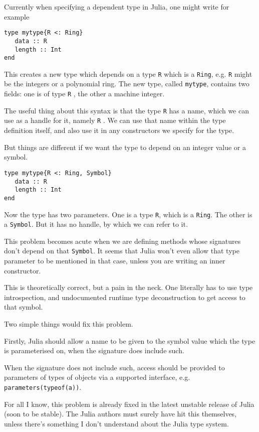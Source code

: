 \documentclass[a4paper,10pt]{article}
\newcommand{\code}{\lstinline}
\begin{document}
Currently when specifying a dependent type in Julia, one might write for example

\begin{lstlisting}
type mytype{R <: Ring}
   data :: R
   length :: Int
end
\end{lstlisting}

This creates a new type which depends on a type \code{R} which is a \code{Ring}, e.g. \code{R}  might
be the integers or a polynomial ring. The new type, called \code{mytype}, contains two fields: one is
of type \code{R} , the other a machine integer.

The useful thing about this syntax is that the type \code{R}  has a name, which we can use as a handle for
it, namely \code{R} . We can use that name within the type definition itself, and also use it in any
constructors we specify for the type.

But things are different if we want the type to depend on an integer value or a symbol.

\begin{lstlisting}
type mytype{R <: Ring, Symbol}
   data :: R
   length :: Int
end
\end{lstlisting}

Now the type has two parameters. One is a type \code{R}, which is a \code{Ring}. The other is a \code{Symbol}.
But it has no handle, by which we can refer to it.

This problem becomes acute when we are defining methods whose signatures don't depend on that
\code{Symbol}. It seems that Julia won't even allow that type parameter to be mentioned in that case,
unless you are writing an inner constructor.

This is theoretically correct, but a pain in the neck. One literally has to use type introspection, and
undocumented runtime type deconstruction to get access to that symbol.

Two simple things would fix this problem.

Firstly, Julia should allow a name to be given to the symbol value which the type is parameterised on, 
when the signature does include such. 

When the signature does not include such, access should be provided to parameters of types of objects
via a supported interface, e.g. \code{parameters(typeof(a))}.

For all I know, this problem is already fixed in the latest unstable release of Julia (soon to be stable).
The Julia authors must surely have hit this themselves, unless there's something I don't understand
about the Julia type system.
\end{document}
